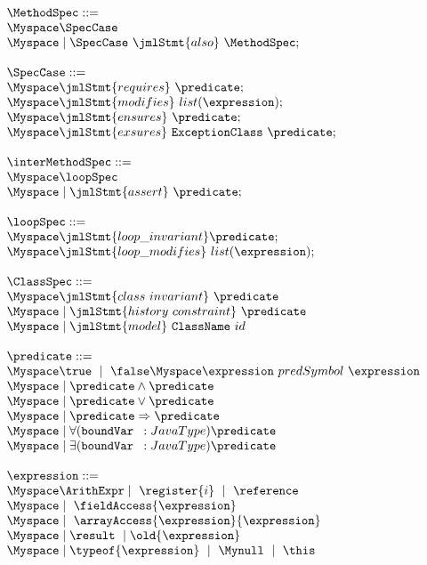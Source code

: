 $$ \begin{array}{l}
\MethodSpec  ::= \\
   \Myspace \SpecCase \\
   \Myspace  \mid  \SpecCase \  \jmlStmt{also} \  \MethodSpec	;\\
   \\
\SpecCase ::= \\ 
    \Myspace \jmlStmt{requires} \ \predicate;\\ 
	\Myspace \jmlStmt{modifies} \ list(\expression);\\
    \Myspace \jmlStmt{ensures} \ \predicate;\\
    \Myspace \jmlStmt{exsures} \ \texttt{ExceptionClass} \ \predicate;\\
                     \\
\interMethodSpec ::= \\
     \Myspace \loopSpec \\
	 \Myspace  \mid \jmlStmt{assert} \ \predicate; \\
	  \\
\loopSpec ::= \\
    \Myspace \jmlStmt{loop\_invariant} \predicate; \\
	\Myspace \jmlStmt{loop\_modifies} \ list(\expression);\\
	 \\								
\ClassSpec ::= \\ 
     \Myspace \jmlStmt{class \ invariant} \ \predicate \\
     \Myspace  \mid  \jmlStmt{history \ constraint} \ \predicate \\
     \Myspace  \mid  \jmlStmt{model} \ \texttt{ClassName}  \ id \\
      \\
      \predicate ::= \\
      \Myspace    \true \ \mid \ \false
      \Myspace   \expression \ predSymbol \ \expression \\
       \Myspace \mid   \predicate \wedge \predicate \\
       \Myspace \mid   \predicate \vee \predicate \\
       \Myspace \mid   \predicate \Rightarrow \predicate \\
       \Myspace \mid   \forall (\texttt{boundVar } : JavaType )  \predicate \\
       \Myspace \mid   \exists(\texttt{boundVar } : JavaType )  \predicate \\
       \\ 
  \expression ::= \\  
      \Myspace  \ArithExpr  \mid  \ \register{i}  \  \mid  \ \reference \\
  	  \Myspace  \mid  \ \fieldAccess{\expression}  \\
  	  \Myspace  \mid \ \arrayAccess{\expression} {\expression}  \\
  	  \Myspace  \mid \result \ \mid \old{\expression}  \\
  	  \Myspace \mid \typeof{\expression}  \ \mid \ \Mynull \ \mid \  \this
\end{array}$$

